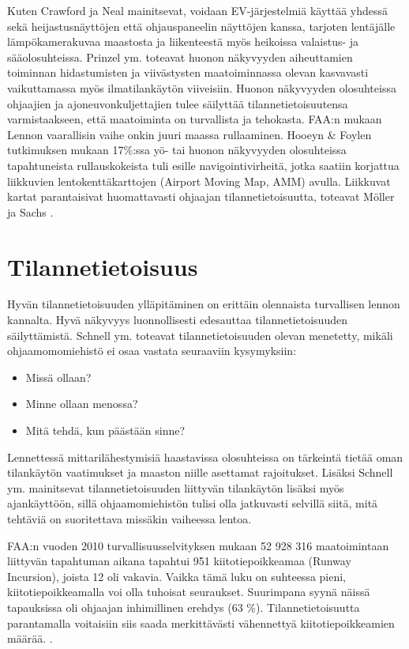 \documentclass[utf8,bachelor,manualbib]{gradu3}
\begin{document}
Kuten Crawford ja Neal \citeyearpar{crawfordneal2006} mainitsevat, voidaan EV-järjestelmiä käyttää yhdessä sekä heijastusnäyttöjen että ohjauspaneelin näyttöjen kanssa, tarjoten lentäjälle lämpökamerakuvaa maastosta ja liikenteestä myös heikoissa valaistus- ja sääolosuhteissa. Prinzel ym. \citeyearpar{prinzel2013} toteavat huonon näkyvyyden aiheuttamien toiminnan hidastumisten ja viivästysten maatoiminnassa olevan kasvavasti vaikuttamassa myös ilmatilankäytön viiveisiin. Huonon näkyvyyden olosuhteissa ohjaajien ja ajoneuvonkuljettajien tulee säilyttää tilannetietoisuutensa varmistaakseen, että maatoiminta on turvallista ja tehokasta. FAA:n mukaan \citeyearpar{gerold2001} Lennon vaarallisin vaihe onkin juuri maassa rullaaminen. Hooeyn \& Foylen \citeyearpar{hooey2007} tutkimuksen mukaan 17\%:ssa yö- tai huonon näkyvyyden olosuhteissa tapahtuneista rullauskokeista tuli esille navigointivirheitä, jotka saatiin korjattua liikkuvien lentokenttäkarttojen (Airport Moving Map, AMM) avulla. Liikkuvat kartat parantaisivat huomattavasti ohjaajan tilannetietoisuutta, toteavat Möller ja Sachs \citeyearpar{mollersachs1994}.

\section{Tilannetietoisuus}

Hyvän tilannetietoisuuden ylläpitäminen on erittäin olennaista turvallisen lennon kannalta. Hyvä näkyvyys luonnollisesti edesauttaa tilannetietoisuuden säilyttämistä. Schnell ym. \citeyearpar{schnellym2004} toteavat tilannetietoisuuden olevan menetetty, mikäli ohjaamomomiehistö ei osaa vastata seuraaviin kysymyksiin:

\begin{itemize}
\item Missä ollaan?
\item Minne ollaan menossa?
\item Mitä tehdä, kun päästään sinne?
\end{itemize}

Lennettessä mittarilähestymisiä haastavissa olosuhteissa on tärkeintä tietää oman tilankäytön vaatimukset ja maaston niille asettamat rajoitukset. Lisäksi Schnell ym. \citeyearpar{schnellym2004} mainitsevat tilannetietoisuuden liittyvän tilankäytön lisäksi myös ajankäyttöön, sillä ohjaamomiehistön tulisi olla jatkuvasti selvillä siitä, mitä tehtäviä on suoritettava missäkin vaiheessa lentoa.

FAA:n vuoden 2010 turvallisuusselvityksen mukaan 52 928 316 maatoimintaan liittyvän tapahtuman aikana tapahtui 951 kiitotiepoikkeamaa (Runway Incursion), joista 12 oli vakavia. Vaikka tämä luku on suhteessa pieni, kiitotiepoikkeamalla voi olla tuhoisat seuraukset. Suurimpana syynä näissä tapauksissa oli ohjaajan inhimillinen erehdys (63 \%). Tilannetietoisuutta parantamalla voitaisiin siis saada merkittävästi vähennettyä kiitotiepoikkeamien määrää. \citep{prinzel2013}.
\end{document}
